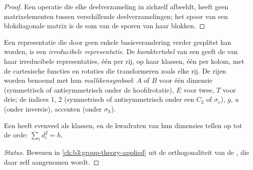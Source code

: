 \begin{proof}
Een operatie die elke deelverzameling in zichzelf afbeeldt, heeft geen
matrixelementen tussen verschillende deelverzamelingen; het spoor van een
blokdiagonale matrix is de som van de sporen van haar blokken.
\end{proof}

\begin{definition}\label{def:b3:point-groups:irrep}
Een representatie die door geen enkele basisverandering verder gesplitst
kan worden, is een
\emph{irreducibele representatie}. De
\emph{karaktertabel} van een  geeft de
 van haar irreducibele representaties, één per rij, op haar
klassen, één per kolom, met de cartesische functies en rotaties die
transformeren zoals elke rij. De rijen worden benoemd met hun
\emph{mullikensymbool}: $A$ of $B$ voor één
dimensie (symmetrisch of antisymmetrisch onder de hoofdrotatie), $E$ voor
twee, $T$ voor drie; de indices 1, 2 (symmetrisch of antisymmetrisch onder
een $C_2$ of $\sigma_v$), $g$, $u$ (onder inversie), accenten (onder $\sigma_h$).
\end{definition}

\begin{proposition}\label{prop:b3:point-groups:irrep-count}
Een  heeft evenveel  als klassen, en
de kwadraten van hun dimensies tellen op tot de orde: $\sum_id_i^2 = h$.
\end{proposition}
\begin{proof}[Status]
Bewezen in \cref{ch:b3:group-theory-applied} uit de orthogonaliteit van de
, die daar zelf aangenomen wordt.
\end{proof}

